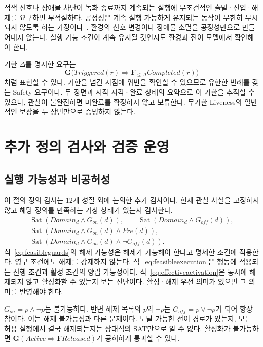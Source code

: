 \documentclass[11pt,a4paper]{article}
\newcommand{\G}{\mathbf{G}}
\newcommand{\F}{\mathbf{F}}
\newcommand{\sat}{\operatorname{Sat}}
\begin{document}
적색 신호나 장애물 차단이 녹화 종료까지 계속되는 실행에
무조건적인 출발·진입·해제를 요구하면 부적절하다.
공정성은 계속 실행 가능하게 유지되는 동작이 무한히 무시되지 않도록 하는 가정이다~\cite{lamport}.
환경의 신호 변경이나 장애물 소멸을 공정성만으로 만들어내지 않는다.
실행 가능 조건이 계속 유지될 것인지도 환경과 전이 모델에서 확인해야 한다.

기한 $\Delta$를 명시한 요구는
\begin{equation}
 \G\bigl(Triggered(r)\Rightarrow\F_{\le\Delta}Completed(r)\bigr)
 \label{eq:boundedresponse}
\end{equation}
처럼 표현할 수 있다.
기한을 넘긴 시점에 위반을 확인할 수 있으므로 유한한 반례를 갖는 Safety 요구이다.
두 장면과 시작 시각·완료 상태의 요약으로 이 기한을 추적할 수 있으나,
관찰이 불완전하면 미완료를 확정하지 않고 보류한다.
무기한 Liveness의 일반적인 보장을 두 장면만으로 증명하지 않는다.

\section{추가 정의 검사와 검증 운영}
\subsection{실행 가능성과 비공허성}
이 절의 정의 검사는 12개 성질 외에 논의한 추가 검사이다.
현재 관찰 사실을 고정하지 않고 해당 정의를 만족하는 가상 상태가 있는지 검사한다.
\begin{align}
 \sat(Domain_d\land G_{on}(d)),\qquad
 \sat(Domain_d\land G_{off}(d)),\label{eq:feasibleguards}\\
 \sat(Domain_d\land G_{on}(d)\land Pre(d)),\label{eq:feasibleexecution}\\
 \sat(Domain_d\land G_{on}(d)\land\neg G_{off}(d)).\label{eq:effectiveactivation}
\end{align}
식~\eqref{eq:feasibleguards}의 해제 가능성은 해제가 가능해야 한다고 명세한 조건에 적용한다.
영구 조건에도 해제를 강제하지 않는다.
식~\eqref{eq:feasibleexecution}은 행동에 적용되는 선행 조건과 활성 조건의 양립 가능성이다.
식~\eqref{eq:effectiveactivation}은 동시에 해제되지 않고 활성화할 수 있는지 보는 진단이다.
활성·해제 우선 의미가 있으면 그 의미를 반영해야 한다.

$G_{on}=p\land\neg p$는 불가능하다.
반면 해제 목록의 $p$와 $\neg p$는 $G_{off}=p\lor\neg p$가 되어 항상 참이다.
이는 해제 불가능성과 다른 문제이다.
도달 가능한 전이 경로가 있는지, 모든 허용 실행에서 결국 해제되는지는
상태식의 SAT만으로 알 수 없다.
활성화가 불가능하면 $\G(Active\Rightarrow\F Released)$가 공허하게 통과할 수 있다.
\end{document}
